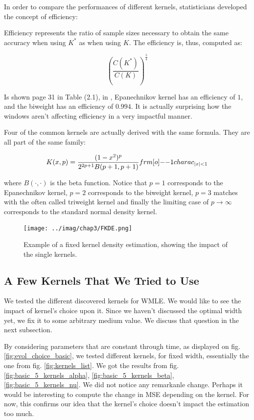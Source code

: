 \documentclass[11pt]{book}
\begin{document}
In order to compare the performances of different kernels, statisticians developed the concept of efficiency:

\begin{definition}
Efficiency represents the ratio of sample sizes necessary
to obtain the same accuracy when using $K^*$ as when using $K$. The efficiency is, thus, computed as:

$$ \left ( \frac{C(K^*)}{C(K)} \right ) ^{\frac 5 4 } $$
\end{definition}

Is shown page 31 in Table (2.1), in \cite{Wand}, Epanechnikov kernel has an efficiency of $1$, and the biweight has an efficiency of $0.994$. It is actually surprising how the windows aren't affecting efficiency in a very impactful manner.



\begin{remarque}
Four of the common kernels are actually derived with the same formula. They are all part of the same family:

$$ K(x,p) = \frac{(1-x^2)^p}{2^{2p+1} B(p+1,p+1) } \11charac_{\abs x < 1 }$$

where $B(\cdot, \cdot)$ is the beta function. Notice that $p=1$ corresponds to the Epanechnikov kernel, $p=2$ corresponds to the biweight kernel, $p=3$ matches with the often called triweight kernel and finally the limiting case of $p \to \infty$ corresponds to the standard normal density kernel. 
\end{remarque}


\begin{figure}
\centering
\texttt{[image: ../imag/chap3/FKDE.png]}
\caption{Example of a fixed kernel density estimation, showing the impact of the single kernels.}
\label{fig:FKDE}
\end{figure}

\subsection{A Few Kernels That We Tried to Use}
\label{section_few_trials_kernels}

We tested the different discovered kernels for WMLE. We would like to see the impact of kernel's choice upon it. Since we haven't discussed the optimal width yet, we fix it to some arbitrary medium value. We discuss that question in the next subsection.

By considering parameters that are constant through time, as displayed on fig. \ref{fig:evol_choice_basic}, we tested different kernels, for fixed width, essentially the one from fig. \ref{fig:kernels_list}. We got the results from fig. \ref{fig:basic_5_kernels_alpha}, \ref{fig:basic_5_kernels_beta}, \ref{fig:basic_5_kernels_nu}. We did not notice any remarkanle change. Perhaps it would be interesting to compute the change in MSE depending on the kernel. For now, this confirms our idea that the kernel's choice doesn't impact the estimation too much.
\end{document}

